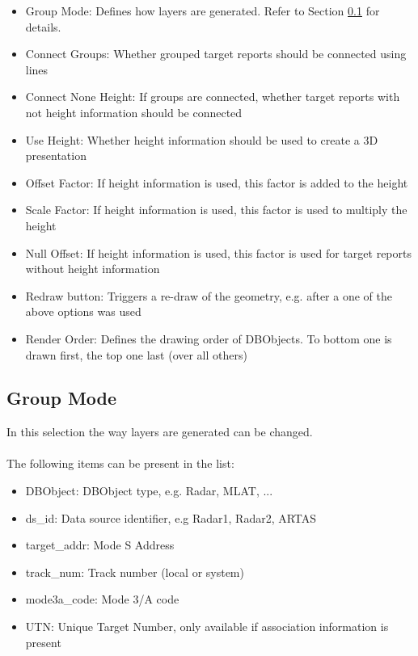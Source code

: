 \begin{itemize}
 \item Group Mode: Defines how layers are generated. Refer to Section \ref{sec:group_mode} for details.
 \item Connect Groups: Whether grouped target reports should be connected using lines
 \item Connect None Height: If groups are connected, whether target reports with not height information should be connected
 \item Use Height: Whether height information should be used to create a 3D presentation
 \item Offset Factor: If height information is used, this factor is added to the height
 \item Scale Factor: If height information is used, this factor is used to multiply the height
 \item Null Offset: If height information is used, this factor is used for target reports without height information
 \item Redraw button: Triggers a re-draw of the geometry, e.g. after a one of the above options was used
 \item Render Order: Defines the drawing order of DBObjects. To bottom one is drawn first, the top one last (over all others)
\end{itemize} 

\subsection{Group Mode}
\label{sec:group_mode}

In this selection the way layers are generated can be changed. \\\\

The following items can be present in the list:

\begin{itemize}
 \item DBObject: DBObject type, e.g. Radar, MLAT, ...
 \item ds\_id: Data source identifier, e.g Radar1, Radar2, ARTAS
 \item target\_addr: Mode S Address
 \item track\_num: Track number (local or system)
 \item mode3a\_code: Mode 3/A code
 \item UTN: Unique Target Number, only available if association information is present
\end{itemize}
\ \\

